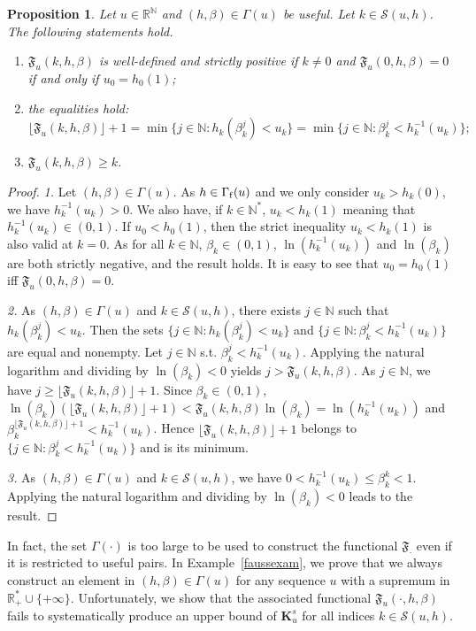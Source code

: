 \documentclass{article}
\def\funset{\Gamma}
\def\secfunh{\funset_{\rm f}}
\def\Fu{\mathfrak{F}_u}
\def\Fgen{\mathfrak{F}_{\cdot}}
\def\rr{\mathbb R}
\def\nn{\mathbb N}
\def\bigks{\mathbf{K}^s}
\def\res{\mathcal{S}}
\newtheorem{prop}{Proposition}
\def\blue#1{#1}
\begin{document}
	\blue{
	\begin{prop}
	\label{prop:simpleFuprop}
	Let $u\in\rr^\nn$ and $(h,\beta)\in \funset(u)$ be useful. Let $k\in\res(u,h)$. The following statements hold.
		\begin{enumerate}
			\item $\Fu(k,h,\beta)$ is well-defined and strictly positive if $k\neq 0$ and $\Fu(0,h,\beta)=0$ if and only if $u_0=h_0(1)$;
			\item the equalities hold:
			\[
			\lfloor \Fu(k,h,\beta)\rfloor+1 =\min\{j\in\nn : h_k(\beta_k^j)< u_k\}
			=\min\{j\in\nn : \beta_k^j< h_k^{-1}(u_k)\};
			\]
			\item $\Fu(k,h,\beta)\geq k$.
	\end{enumerate}			
	\end{prop}
}
	\begin{proof}
\blue{
		\emph{1.} Let $(h,\beta)\in \funset(u)$. As $h\in\secfunh(u)$ and we only consider $u_k>h_k(0)$, we have $h_k^{-1}(u_k)>0$. We also have, if $k\in\nn^*$, $u_k<h_k(1)$ meaning that $h_k^{-1}(u_k)\in (0,1)$. If $u_0<h_0(1)$, then the strict inequality $u_k<h_k(1)$ is also valid at $k=0$. As for all $k\in\nn$, $\beta_k\in (0,1)$, $\ln(h_k^{-1}(u_k))$ and $\ln(\beta_k)$ are both strictly negative, and the result holds. It is easy to see that $u_0=h_0(1)$ iff $\Fu(0,h,\beta)=0$.
}

\blue{
\emph{2.} As $(h,\beta)\in \funset(u)$ and $k\in\res(u,h)$, there exists $j\in\nn$ such that $h_k(\beta_k^j)<u_k$. Then the sets
		$\{j\in\nn : h_k(\beta_k^j)< u_k\}$ and $\{j\in\nn : \beta_k^j< h_k^{-1}(u_k)\}$ are equal and nonempty. Let $j\in\nn$ s.t. $\beta_k^j< h_k^{-1}(u_k)$. Applying the natural logarithm and dividing by $\ln(\beta_k)<0$ yields $j> \Fu(k,h,\beta)$. As $j\in\nn$, we have $j\geq \lfloor \Fu(k,h,\beta)\rfloor+1$. 
		Since $\beta_k\in(0,1)$, $\ln(\beta_k)(\lfloor \Fu(k,h,\beta)\rfloor+1)<\Fu(k,h,\beta)\ln(\beta_k)=\ln(h_k^{-1}(u_k))$ and $\beta_k^{\lfloor \Fu(k,h,\beta)\rfloor+1}<h_k^{-1}(u_k)$. Hence $\lfloor \Fu(k,h,\beta)\rfloor+1$ belongs to $\{j\in\nn : \beta_k^j< h_k^{-1}(u_k)\}$ and is its minimum.
}

\blue{
\emph{3.} As $(h,\beta)\in\funset(u)$ and $k\in\res(u,h)$, we have $0<h_k^{-1}(u_k)\leq \beta_k^k<1$. Applying the natural logarithm and dividing by $\ln(\beta_k)<0$ leads to the result.
}
		\end{proof}
	\blue{
	In fact, the set $\funset(\cdot)$ is too large to be used to construct the functional $\Fgen$ even if it is restricted to useful pairs. In Example~\ref{faussexam}, we prove that we always construct an element in $(h,\beta)\in\funset(u)$ for any sequence $u$ with a supremum in $\rr_+^*\cup\{+\infty\}$. \blue{Unfortunately}, we show that the associated functional $\Fu(\cdot,h,\beta)$ fails to systematically produce an upper bound of $\bigks_u$ for all indices $k\in\res(u,h)$.
	}
\end{document}
